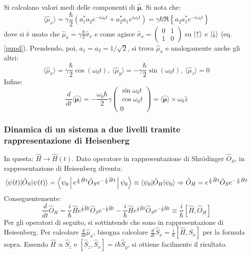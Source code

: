 \documentclass[11pt, a4paper]{scrartcl} %
\numberwithin{equation}{subsection}
\theoremstyle{style2}
\theoremstyle{style1}
\begin{document}
Si calcolano valori medi delle componenti di $\hat{\pmb{\mu }} $. Si nota che:
\begin{equation}
		\langle \hat{\mu }_x \rangle = \gamma \frac{\hbar }{2} \left(a_1^* a_2 e^{-i\omega_0 t} + a_2^* a_1 e^{ i \omega_0 t} \right)= \gamma \hbar  \Re \left\{ a_2a_1^* e^{-i\omega_0 t}  \right\} 
\end{equation}
dove si \`e usato che $\hat{\mu } _x = \gamma \frac{\hbar }{2} \hat{\sigma }_x$ e come agisce $\hat{\sigma } _x = \begin{pmatrix} 0& 1 \\ 1 & 0  \end{pmatrix} $ su $\ket{\uparrow} $ e $\ket{\downarrow} $ (eq. \ref{pupd}). Prendendo, poi, $a_1=a_2 = 1 / \sqrt{2} $, si trova $\hat{\mu } _x$ e analogamente anche gli altri:
\begin{equation}
	\langle \hat{\mu } _x \rangle = \gamma \frac{\hbar}{2} \cos(\omega_0 t) , \ \langle \hat{\mu } _y \rangle = - \gamma \frac{\hbar }{2} \sin(\omega_0t) , \ \langle \hat{\mu } _z \rangle = 0
\end{equation}
Infine:
\begin{equation}
		\frac{d }{d t} \langle \hat{\pmb{\mu } } \rangle = - \frac{\omega_0 \hbar }{2} \gamma \begin{pmatrix} \sin \omega_0 t \\ \cos \omega_0 t \\ 0 \end{pmatrix} = \langle \hat{\pmb{\mu }  }\rangle \times \omega _0 \hat{z}
\end{equation}

\subsubsection{Dinamica di un sistema a due livelli tramite rappresentazione di Heisenberg}

In questa: $\hat{H} \to \hat{H} (t)$. Dato operatore in rappresentazione di Shr\"odinger $\hat{O}_S$, in rappresentazione di Heisenberg diventa:
\[
\braket{\psi (t)| \hat{O}_S|\psi (t)} = \Braket{\psi _0| e^{ \frac{i}{\hbar } \hat{H}t} \hat{O}_S e^{-\frac{i}{\hbar }\hat{H}t} | \psi _0}  \equiv \braket{\psi_0|\hat{O}_H|\psi _0} \Rightarrow \hat{O}_H = e^{ \frac{i}{\hbar } \hat{H}t} \hat{O}_S e^{-\frac{i}{\hbar }\hat{H}t} 
\] 
Conseguentemente:
\begin{equation}
	\frac{d }{d t}  \hat{O}_H = \frac{i}{\hbar }\hat{H} e^{ \frac{i}{\hbar } \hat{H}t}  \hat{O}_S  e^{- \frac{i}{\hbar }\hat{H}t}  - \frac{i}{\hbar } \hat{H} e^{ \frac{i}{\hbar }\hat{H}t}  \hat{O}_S e^{ - \frac{i}{\hbar }\hat{H}t} \equiv \frac{i}{\hbar } [\hat{H},\hat{O}_H] 	 
\end{equation}
Per gli operatori di seguito, si sottintende che sono in rappresentazione di Heisenberg. Per calcolare $\frac{d }{d t} \hat{\mu }_x$, bisogna calcolare $\frac{d }{d t} \hat{S}_x = \frac{i}{\hbar }[\hat{H},\hat{S}_x]$ per la formula sopra. 
Essendo $\hat{H} \propto \hat{S }_z$ e $[\hat{S}_z, \hat{S}_x] = i\hbar  \hat{S}_y$, si ottiene facilmente il risultato.
\end{document}
